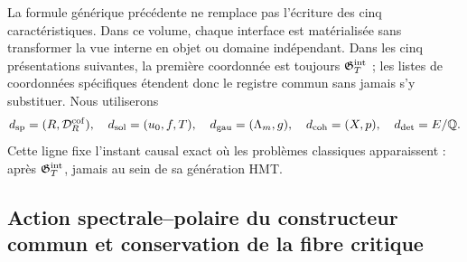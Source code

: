 La formule générique précédente ne remplace pas l’écriture des cinq caractéristiques. Dans ce volume, chaque interface est matérialisée sans transformer la vue interne en objet ou domaine indépendant. Dans les cinq présentations suivantes, la première coordonnée est toujours $\mathfrak G_T^{\rm int}$ ; les listes de coordonnées spécifiques étendent donc le registre commun sans jamais s’y substituer. Nous utiliserons
\[
 d_{\rm sp}=(R,\mathcal D_R^{\rm cof}),\quad
 d_{\rm sol}=(u_0,f,T),\quad
 d_{\rm gau}=(\Lambda_m,g),\quad
 d_{\rm coh}=(X,p),\quad
 d_{\rm det}=E/\mathbb Q.
\]
Cette ligne fixe l’instant causal exact où les problèmes classiques apparaissent : après \(\mathfrak G_T^{\rm int}\), jamais au sein de sa génération HMT.

\subsection{Action spectrale–polaire du constructeur commun et conservation de la fibre critique}

